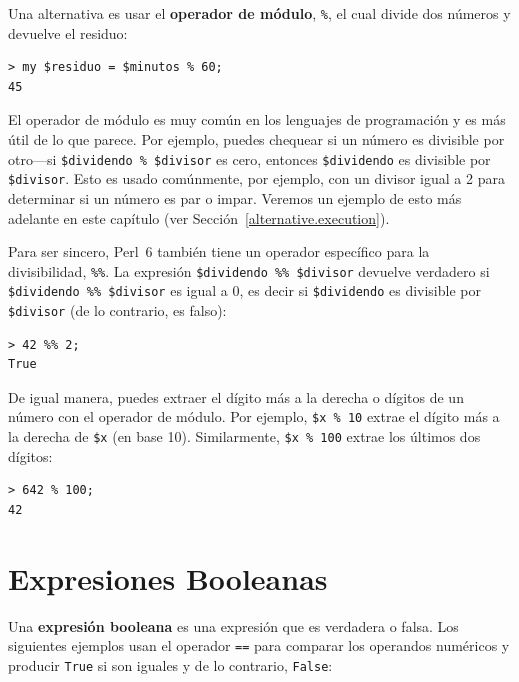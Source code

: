 Una alternativa es usar el {\bf operador de módulo}, \verb|%|,
el cual divide dos números y devuelve el residuo:

\begin{lstlisting}
> my $residuo = $minutos % 60;
45
\end{lstlisting}
%
El operador de módulo es muy común en los lenguajes de programación
y es más útil de lo que parece. Por ejemplo, puedes chequear si
un número es divisible por otro---si {\tt \$dividendo \% \$divisor} es cero, entonces {\tt \$dividendo} es divisible por {\tt \$divisor}. 
Esto es usado comúnmente, por ejemplo, con un divisor igual a 2 para determinar si un número es par o impar. Veremos un ejemplo
de esto más adelante en este capítulo (ver Sección~\ref{alternative.execution}).

Para ser sincero, Perl~6 también tiene un operador específico 
para la divisibilidad, \verb|%%|. La expresión
\verb|$dividendo %% $divisor| devuelve verdadero si 
\verb|$dividendo %% $divisor| es igual a 0,
es decir si {\tt \$dividendo} es divisible por {\tt \$divisor} 
(de lo contrario, es falso):
\begin{lstlisting}
> 42 %% 2;
True
\end{lstlisting}

De igual manera, puedes extraer el dígito más a la
derecha o dígitos de un número con el operador
de módulo. Por ejemplo, {\tt \$x \% 10}  extrae el
dígito más a la derecha de {\tt \$x} (en base 10).
Similarmente, {\tt \$x \% 100} extrae los últimos dos 
dígitos:

\begin{lstlisting}
> 642 % 100;
42
\end{lstlisting}
%



\section{Expresiones Booleanas}

Una {\bf expresión booleana} es una expresión que es
verdadera o falsa. Los siguientes ejemplos usan el operador
{\tt ==} para comparar los operandos numéricos y producir
{\tt True} si son iguales y de lo contrario, {\tt False}:

